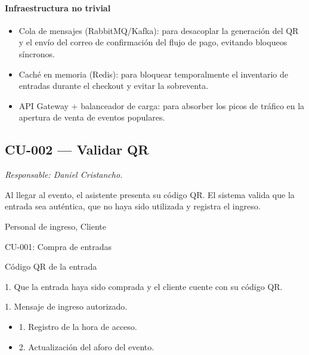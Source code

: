 \paragraph{Infraestructura no trivial}
\begin{itemize}[leftmargin=1.4em, topsep=1pt]
  \item Cola de mensajes (RabbitMQ/Kafka): para desacoplar la generación del QR y el envío del correo de confirmación del flujo de pago, evitando bloqueos síncronos.
  \item Caché en memoria (Redis): para bloquear temporalmente el inventario de entradas durante el checkout y evitar la sobreventa.
  \item API Gateway + balanceador de carga: para absorber los picos de tráfico en la apertura de venta de eventos populares.
\end{itemize}

\subsection{CU-002 --- Validar QR}
\label{cu:cu-002}
\textit{Responsable: Daniel Cristancho.}

\begin{description}[leftmargin=!, labelwidth=3.4cm, style=nextline, topsep=3pt]
\item[Objetivo] Al llegar al evento, el asistente presenta su código QR. El sistema valida que la entrada sea auténtica, que no haya sido utilizada y registra el ingreso.

\item[Actores] Personal de ingreso, Cliente

\item[CU relacionados] CU-001: Compra de entradas

\item[Entradas] Código QR de la entrada

\item[Pre-condiciones] 1. Que la entrada haya sido comprada y el cliente cuente con su código QR.

\item[Salidas] 1. Mensaje de ingreso autorizado.

\item[Post-condiciones] \hfill
\begin{itemize}[leftmargin=1.2em, topsep=1pt]
  \item 1. Registro de la hora de acceso.
  \item 2. Actualización del aforo del evento.
\end{itemize}

\end{description}

